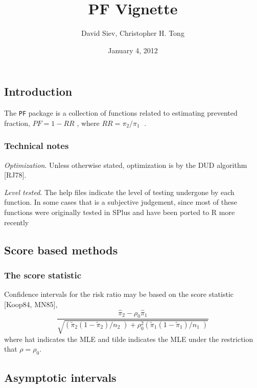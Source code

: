 \documentclass[]{article}
\title{PF Vignette}
\author{David Siev, Christopher H. Tong}
\date{January 4, 2012}
\begin{document}
\maketitle

\subsection{Introduction}\label{introduction}

The \texttt{PF} package is a collection of functions related to
estimating prevented fraction, \(PF=1-RR\) , where
\(RR={{{\pi}_{2}}}/{{{\pi}_{1}}}\;\) .

\subsubsection{Technical notes}\label{technical-notes}

\emph{Optimization}. Unless otherwise stated, optimization is by the DUD
algorithm {[}RJ78{]}.

\emph{Level tested}. The help files indicate the level of testing
undergone by each function. In some cases that is a subjective
judgement, since most of these functions were originally tested in SPlus
and have been ported to R more recently

\subsection{Score based methods}\label{score-based-methods}

\subsubsection{The score statistic}\label{the-score-statistic}

Confidence intervals for the risk ratio may be based on the score
statistic {[}Koop84, MN85{]},
\[\frac{{{{\hat{\pi }}}_{2}}-{{\rho }_{0}}{{{\hat{\pi }}}_{1}}}{\sqrt{\left( {{{{\tilde{\pi }}}_{2}}(1-{{{\tilde{\pi }}}_{2}})}/{{{n}_{2}}}\; \right)+\rho _{0}^{2}\left( {{{{\tilde{\pi }}}_{1}}(1-{{{\tilde{\pi }}}_{1}})}/{{{n}_{1}}}\; \right)}}\]
where hat indicates the MLE and tilde indicates the MLE under the
restriction that \(\rho ={{\rho }_{0}}\).

\subsection{Asymptotic intervals}\label{asymptotic-intervals}
\end{document}
